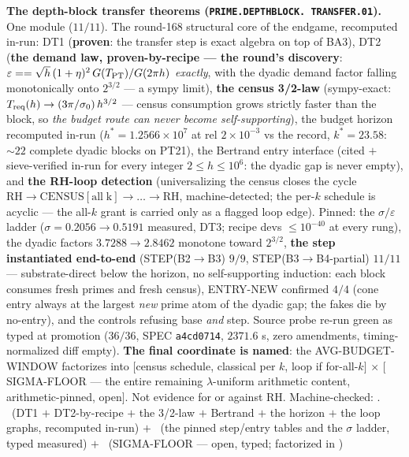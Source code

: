 \documentclass[11pt,a4paper]{article}
\theoremstyle{definition}
\begin{document}
\par\smallskip\noindent\textbf{The depth-block transfer theorems
(\texttt{PRIME.\allowbreak DEPTHBLOCK.\allowbreak
TRANSFER.01}).}
One module ($11/11$).  The round-168 structural core of the
endgame, recomputed in-run: DT1 (\textbf{proven}: the transfer
step is exact algebra on top of BA3), DT2 (\textbf{the demand
law, proven-by-recipe --- the round's discovery}:
$\varepsilon == \sqrt{h}\,(1 + \eta)^2\,G(T_{\rm PT})/G(2\pi h)$
\emph{exactly}, with the dyadic demand factor falling
monotonically onto $2^{3/2}$ --- a sympy limit), \textbf{the
census 3/2-law} (sympy-exact: $T_{\rm req}(h) \to
(3\pi/\sigma_0)\,h^{3/2}$ --- census consumption grows strictly
faster than the block, so \emph{the budget route can never
become self-supporting}), the budget horizon recomputed in-run
($h^* = 1.2566\times10^7$ at rel $2\times10^{-3}$ vs the record,
$k^* = 23.58$: ${\sim}22$ complete dyadic blocks on PT21), the
Bertrand entry interface (cited $+$ sieve-verified in-run for
every integer $2 \le h \le 10^6$: the dyadic gap is never
empty), and \textbf{the RH-loop detection} (universalizing the
census closes the cycle $\mathrm{RH} \to \mathrm{CENSUS[all\;k]}
\to \dots \to \mathrm{RH}$, machine-detected; the per-$k$
schedule is acyclic --- the all-$k$ grant is carried only as a
flagged loop edge).  Pinned: the $\sigma/\varepsilon$ ladder
($\sigma = 0.2056 \to 0.5191$ measured, DT3; recipe devs $\le
10^{-40}$ at every rung), the dyadic factors $3.7288 \to
2.8462$ monotone toward $2^{3/2}$, \textbf{the step instantiated
end-to-end} (STEP(B2$\to$B3) $9/9$, STEP(B3$\to$B4-partial)
$11/11$ --- substrate-direct below the horizon, no
self-supporting induction: each block consumes fresh primes and
fresh census), ENTRY-NEW confirmed $4/4$ (cone entry always at
the largest \emph{new} prime atom of the dyadic gap; the fakes
die by no-entry), and the controls refusing base \emph{and}
step.  Source probe re-run green as typed at promotion ($36/36$,
SPEC \texttt{a4cd0714}, $2371.6$ s, zero amendments,
timing-normalized diff empty).  \textbf{The final coordinate is
named}: the AVG-BUDGET-WINDOW factorizes into $[$census
schedule, classical per $k$, loop if for-all-$k]$ $\times$
$[$SIGMA-FLOOR --- the entire remaining $\lambda$-uniform
arithmetic content, arithmetic-pinned, open$]$.  Not evidence
for or against RH.
Machine-checked:
.
\mE\ (DT1 $+$ DT2-by-recipe $+$ the 3/2-law $+$ Bertrand $+$
the horizon $+$ the loop graphs, recomputed in-run) $+$ \mC\
(the pinned step/entry tables and the $\sigma$ ladder, typed
measured) $+$ \mO\ (SIGMA-FLOOR --- open, typed; factorized in
)
\par\smallskip
\end{document}
